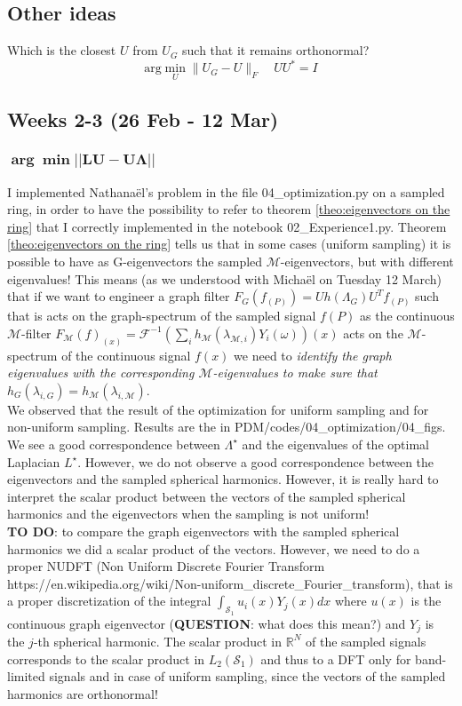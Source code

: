 \subsection*{Other ideas}

Which is the closest $U$ from $U_{G}$ such that it remains orthonormal?
\[
\text{arg}\min_{U}\|U_{G}-U\|_{F}\hspace{1em}UU^{*}=I
\]

\subsection{Weeks 2-3 (26 Feb - 12 Mar)}

\subsubsection*{$\mathbf{\arg \min ||LU-U\Lambda||}$}
I implemented Nathana\"el's problem in the file 04\_optimization.py on a sampled ring, in order to have the possibility to refer to theorem \ref{theo:eigenvectors on the ring} that I correctly implemented in the notebook 02\_Experience1.py. Theorem \ref{theo:eigenvectors on the ring} tells us that in some cases (uniform sampling) it is possible to have as G-eigenvectors the sampled $\mathcal{M}$-eigenvectors, but with different eigenvalues! This means (as we understood with Micha\"el on Tuesday 12 March) that if we want to engineer a graph filter $F_G(f_{(P)}) = Uh(\Lambda_G)U^Tf_{(P)}$ such that is acts on the graph-spectrum of the sampled signal $f(P)$ as the continuous $\mathcal{M}$-filter $F_\mathcal M(f)_{(x)} =  \mathcal F^{-1}\left(\sum_i h_{\mathcal M}(\lambda_{\mathcal M, i}) Y_i(\omega)\right)(x)$ acts on the $\mathcal M$-spectrum of the continuous signal $f(x)$ we need to \textit{identify the graph eigenvalues with the corresponding $\mathcal M$-eigenvalues to make sure that $h_G(\lambda_{i,G}) = h_{\mathcal M}(\lambda_{i,\mathcal M}) $}.\\
We observed that the result of the optimization for uniform sampling and for non-uniform sampling. Results are the in PDM/codes/04\_optimization/04\_figs. We see a good correspondence between $\Lambda^\star$ and the eigenvalues of the optimal Laplacian $L^\star$. However, we do not observe a good correspondence between the eigenvectors and the sampled spherical harmonics. However, it is really hard to interpret the scalar product between the vectors of the sampled spherical harmonics and the eigenvectors when the sampling is not uniform!\\
\textbf{TO DO}: to compare the graph eigenvectors with the sampled spherical harmonics we did a scalar product of the vectors. However, we need to do a proper NUDFT (Non Uniform Discrete Fourier Transform https://en.wikipedia.org/wiki/Non-uniform\_discrete\_Fourier\_transform), that is a proper discretization of the integral $\int_{\mathcal S_1} u_i(x) Y_j(x) dx$ where $u(x)$ is the continuous graph eigenvector (\textbf{QUESTION}: what does this mean?) and $Y_j$ is the $j$-th spherical harmonic. The scalar product in $\mathbb R^N$ of the sampled signals corresponds to the scalar product in $L_2(\mathcal S_1)$ and thus to a DFT only for band-limited signals and in case of uniform sampling, since the vectors of the sampled harmonics are orthonormal!
